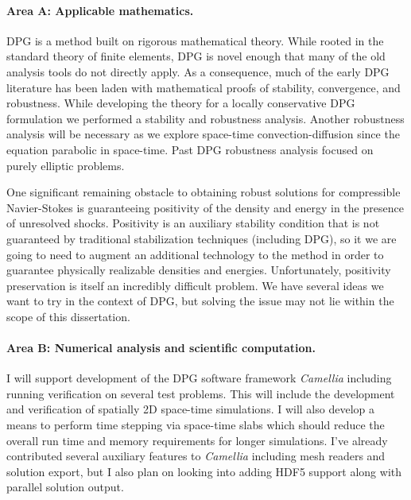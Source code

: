 \documentclass[letterpaper]{article}
\begin{document}


\paragraph{Area A: Applicable mathematics.}
DPG is a method built on rigorous mathematical theory.
While rooted in the standard theory of finite elements, DPG is novel enough that many of the old analysis tools do not directly apply.
As a consequence, much of the early DPG literature has been laden with mathematical proofs of stability, convergence, and robustness.
While developing the theory for a locally conservative DPG formulation we performed a stability and robustness analysis.
Another robustness analysis will be necessary as we explore space-time convection-diffusion since the equation parabolic in space-time.
Past DPG robustness analysis focused on purely elliptic problems.

One significant remaining obstacle to obtaining robust solutions for compressible Navier-Stokes is guaranteeing positivity of the density and
energy in the presence of unresolved shocks. 
Positivity is an auxiliary stability condition that is not guaranteed by traditional stabilization 
techniques (including DPG), so it we are going to need to augment an additional technology to the method in order to guarantee physically
realizable densities and energies. 
Unfortunately, positivity preservation is itself an incredibly difficult problem. 
We have several ideas we want to try in the context of DPG, but solving the issue may not lie within the scope of this dissertation.

\paragraph{Area B: Numerical analysis and scientific computation.}
I will support development of the DPG software framework \emph{Camellia}\cite{Roberts2011} including running verification on several test problems.
This will include the development and verification of spatially 2D space-time simulations.
I will also develop a means to perform time stepping via space-time slabs which should reduce the 
overall run time and memory requirements for longer simulations.
I've already contributed several auxiliary features to \emph{Camellia} including mesh readers and solution export, 
but I also plan on looking into adding HDF5 support along with parallel solution output.
\end{document}
